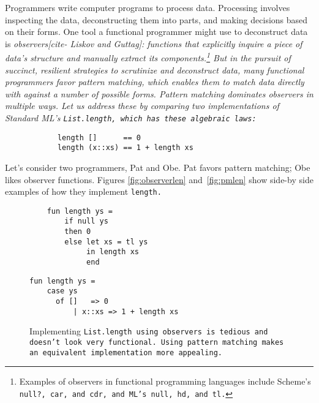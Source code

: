 \documentclass[manuscript,screen,review, 12pt]{acmart}
\begin{document}
    Programmers write computer programs to process data. Processing involves
    inspecting the data, deconstructing them into parts, and making decisions
    based on their forms. One tool a functional programmer might use to
    deconstruct data is \it{observers}[cite- Liskov and Guttag]: functions that
    explicitly inquire a piece of data's structure and manually extract its
    components.\footnote {Examples of observers in functional programming
    languages include Scheme's \tt{null?}, \tt{car}, and \tt{cdr}, and ML's
    \tt{null}, \tt{hd}, and \tt{tl}.} But in the pursuit of succinct, resilient
    strategies to scrutinize and deconstruct data, many functional programmers
    favor \it{pattern matching}, which enables them to match data directly with
    against a number of possible forms. Pattern matching dominates observers in
    multiple ways. Let us address these by comparing two implementations of
    Standard ML's \tt{List.length}, which has these algebraic laws: 

    \begin{minipage}[t]{\textwidth}
        \begin{verbatim}
            length []      == 0
            length (x::xs) == 1 + length xs 
        \end{verbatim}
    \end{minipage}
    
    Let's consider two programmers, Pat and Obe. Pat favors pattern matching;
    Obe likes observer functions. Figures \ref{fig:observerlen}
    and~\ref{fig:pmlen} show side-by side examples of how they implement
    \tt{length}. 

    \begin{figure}[h]
        \centering
      \begin{minipage}[t]{0.4\textwidth}
        \begin{verbatim}
    fun length ys =
        if null ys 
        then 0 
        else let xs = tl ys 
             in length xs 
             end 
            \end{verbatim}
            \label{fig:observerlen} 
      \end{minipage}
      \quad
      \begin{minipage}[t]{0.4\textwidth}
        \begin{verbatim}
fun length ys =
    case ys 
      of []   => 0
          | x::xs => 1 + length xs
                \end{verbatim}
       \vspace{2.2em}
       \label{fig:pmlen}
      \end{minipage}
      \caption{Implementing \tt{List.length} using observers is tedious and doesn't
      look very functional. Using pattern matching makes an equivalent
      implementation more appealing.}
      \label{fig:len}
    \end{figure}
    
\end{document}
